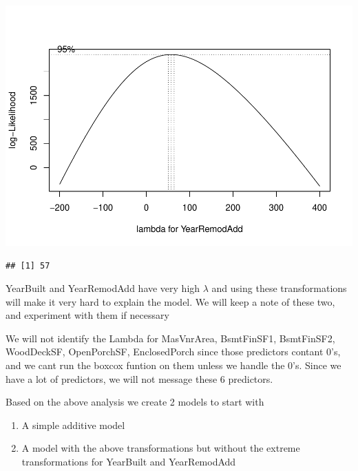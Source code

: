 \documentclass[
]{article}
\newenvironment{Shaded}{\begin{snugshade}}{\end{snugshade}}
\newcommand{\KeywordTok}[1]{\textcolor[rgb]{0.13,0.29,0.53}{\textbf{#1}}}
\newcommand{\NormalTok}[1]{#1}
\newcommand{\OperatorTok}[1]{\textcolor[rgb]{0.81,0.36,0.00}{\textbf{#1}}}
\newcommand{\StringTok}[1]{\textcolor[rgb]{0.31,0.60,0.02}{#1}}
\providecommand{\tightlist}{%
  \setlength{\itemsep}{0pt}\setlength{\parskip}{0pt}}
\begin{document}
\includegraphics{Project_files/figure-latex/unnamed-chunk-20-1.pdf}

\begin{Shaded}
\end{Shaded}

\begin{verbatim}
## [1] 57
\end{verbatim}

YearBuilt and YearRemodAdd have very high \(\lambda\) and using these transformations will make it very hard to explain the model. We will keep a note of these two, and experiment with them if necessary

We will not identify the Lambda for MasVnrArea, BsmtFinSF1, BsmtFinSF2, WoodDeckSF, OpenPorchSF, EnclosedPorch since those predictors contant 0's, and we cant run the boxcox funtion on them unless we handle the 0's. Since we have a lot of predictors, we will not message these 6 predictors.

Based on the above analysis we create 2 models to start with

\begin{enumerate}
\def\labelenumi{\arabic{enumi})}
\tightlist
\item
  A simple additive model
\item
  A model with the above transformations but without the extreme transformations for YearBuilt and YearRemodAdd
\end{enumerate}
\end{document}
